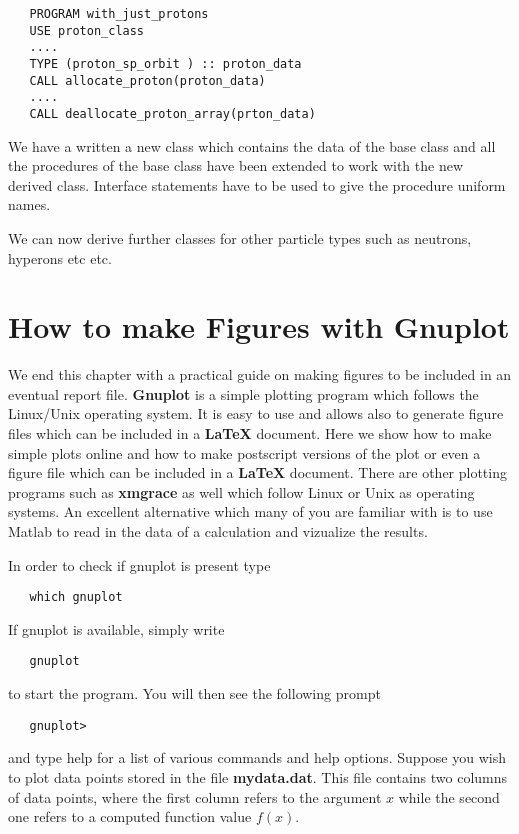 \begin{lstlisting}
   PROGRAM with_just_protons
   USE proton_class
   ....
   TYPE (proton_sp_orbit ) :: proton_data
   CALL allocate_proton(proton_data)
   ....
   CALL deallocate_proton_array(prton_data)

\end{lstlisting}

We have a written a new class which contains the data of the base
class and all the procedures of the base class have been extended 
to work with the new derived class. Interface statements have to be
used to give the procedure uniform names.

We can now derive further classes for other particle types such as neutrons, hyperons etc etc. 
\section{How to make Figures with Gnuplot}\label{sec:gnuplot}
We end this chapter with a practical guide on making figures to be included in an eventual
report file.
{\bf Gnuplot} is a simple plotting program which follows the Linux/Unix 
operating system. It is easy to use and allows also to generate 
figure files which can be included in a {\bf \LaTeX} document. Here we show how to make
simple plots online and how to make postscript versions of the plot or even
a figure file which can be included in a {\bf \LaTeX} document. There are
other plotting programs such as {\bf xmgrace} as well 
which follow Linux or Unix as operating systems. An excellent alternative which many of you are familiar
with is to use Matlab to read in the data of a calculation and vizualize the results.

In order to check if gnuplot is present type
\begin{verbatim}
   which gnuplot
\end{verbatim}
If gnuplot is available, simply write 
\begin{verbatim}
   gnuplot
\end{verbatim}
to start the program. You will then see the following prompt
\begin{verbatim}
   gnuplot>
\end{verbatim}
and type help for a list of various commands and help options. 
Suppose you wish to plot data points stored in the file 
{\bf mydata.dat}. This file contains two columns of data points, where 
the first column refers
to the argument $x$ while the second one refers 
to a computed function value $f(x)$. 

